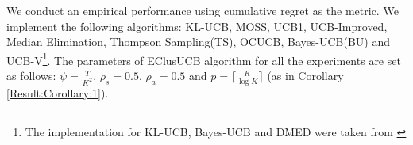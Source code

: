 We conduct an empirical performance using cumulative regret as the metric. We implement the following algorithms:  KL-UCB\cite{garivier2011kl}, MOSS\cite{audibert2009minimax}, UCB1\cite{auer2002finite}, UCB-Improved\cite{auer2010ucb}, Median Elimination\cite{even2006action}, Thompson Sampling(TS)\cite{agrawal2011analysis}, OCUCB\cite{lattimore2015optimally}, Bayes-UCB(BU)\cite{kaufmann2012bayesian} and UCB-V\cite{audibert2009exploration}\footnote{The implementation for KL-UCB, Bayes-UCB and DMED were taken from \cite{CapGarKau12}}. The parameters of EClusUCB algorithm for all the experiments are set as follows: $\psi=\frac{T}{K^2}$, $\rho_{s}=0.5$, $\rho_{a}=0.5$ and $p=\lceil\frac{K}{\log K}\rceil$ (as in Corollary \ref{Result:Corollary:1}).

